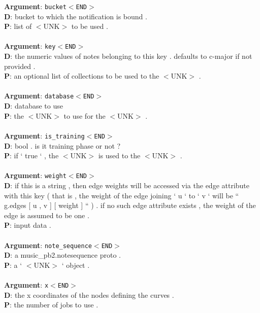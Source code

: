 \textbf{Argument}: \texttt{bucket$<$END$>$}\\
\textbf{D}: bucket to which the notification is bound .\\
\textbf{P}: list of $<$UNK$>$ to be used .\\
\\

\textbf{Argument}: \texttt{key$<$END$>$}\\
\textbf{D}: the numeric values of notes belonging to this key . defaults to c-major if not provided .\\
\textbf{P}: an optional list of collections to be used to the $<$UNK$>$ .\\
\\

\textbf{Argument}: \texttt{database$<$END$>$}\\
\textbf{D}: database to use\\
\textbf{P}: the $<$UNK$>$ to use for the $<$UNK$>$ .\\
\\

\textbf{Argument}: \texttt{is\_training$<$END$>$}\\
\textbf{D}: bool . is it training phase or not ?\\
\textbf{P}: if ` true ` , the $<$UNK$>$ is used to the $<$UNK$>$ .\\
\\

\textbf{Argument}: \texttt{weight$<$END$>$}\\
\textbf{D}: if this is a string , then edge weights will be accessed via the edge attribute with this key ( that is , the weight of the edge joining ` u ` to ` v ` will be `` g.edges [ u , v ] [ weight ] `` ) . if no such edge attribute exists , the weight of the edge is assumed to be one .\\
\textbf{P}: input data .\\
\\

\textbf{Argument}: \texttt{note\_sequence$<$END$>$}\\
\textbf{D}: a music\_pb2.notesequence proto .\\
\textbf{P}: a ` $<$UNK$>$ ` object .\\
\\

\textbf{Argument}: \texttt{x$<$END$>$}\\
\textbf{D}: the x coordinates of the nodes defining the curves .\\
\textbf{P}: the number of jobs to use .\\
\\

